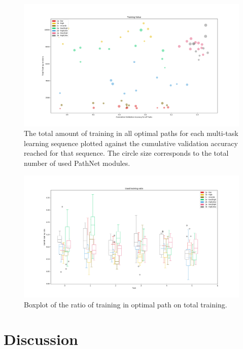 \begin{figure}[h]
    \includegraphics[width=\textwidth]{Chapters/Experiments/search_algo/figures/Training_value.png}
    \caption{The total amount of training in all optimal paths for each multi-task learning sequence plotted against the cumulative validation accuracy reached for that sequence. The circle size corresponds to the total number of used PathNet modules.}
    \label{fig:search.training_value}
\end{figure}

\begin{figure}[h]
    \includegraphics[width=\textwidth]{Chapters/Experiments/search_algo/figures/Used_training_ratio.png}
    \caption{Boxplot of the ratio of training in optimal path on total training.}
    \label{fig:search.usefull_training}
\end{figure}


\section{Discussion}
